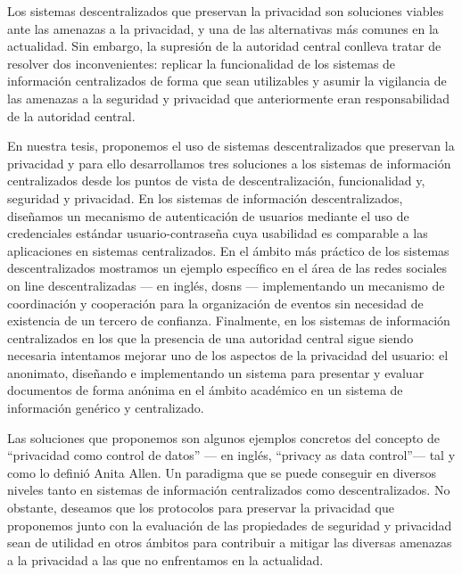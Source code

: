     Los sistemas descentralizados que preservan la privacidad son soluciones viables  
    ante las amenazas a la privacidad, y una de las alternativas más comunes en 
    la actualidad. Sin embargo, la supresión de la autoridad central conlleva tratar 
    de resolver dos inconvenientes: replicar la funcionalidad de los sistemas 
    de información centralizados de forma que sean utilizables y asumir la vigilancia  
    de las amenazas a la seguridad y privacidad que anteriormente eran responsabilidad 
    de la autoridad central.
    
    En nuestra tesis, proponemos el uso de sistemas descentralizados que preservan 
    la privacidad y para ello desarrollamos tres soluciones a los sistemas de información 
    centralizados desde los puntos de vista de descentralización, funcionalidad 
    y, seguridad y privacidad. En los sistemas de información descentralizados, 
    diseñamos un mecanismo de autenticación de usuarios mediante el uso de credenciales 
    estándar usuario-contraseña cuya usabilidad es comparable a las aplicaciones 
    en sistemas centralizados. En el ámbito más práctico de los sistemas descentralizados 
    mostramos un ejemplo específico en el área de las redes sociales on line descentralizadas 
    --- en inglés, \aclp*{dosn} --- implementando un mecanismo de coordinación y 
    cooperación para la organización de eventos sin necesidad de existencia de un 
    tercero de confianza. Finalmente, en los sistemas de información centralizados 
    en los que la presencia de una autoridad central sigue siendo necesaria intentamos 
    mejorar uno de los aspectos de la privacidad del usuario: el anonimato, diseñando 
    e implementando un sistema para presentar y evaluar documentos de forma anónima 
    en el ámbito académico en un sistema de información genérico y centralizado.
    
    Las soluciones que proponemos son algunos ejemplos concretos del concepto de 
    ``privacidad como control de datos'' --- en inglés, ``privacy as data control''--- 
    tal y como lo definió Anita Allen. Un paradigma que se puede conseguir en diversos 
    niveles tanto en sistemas de información centralizados como descentralizados. 
    No obstante, deseamos que los protocolos para preservar la privacidad que proponemos 
    junto con la evaluación de las propiedades de seguridad y privacidad sean de 
    utilidad en otros ámbitos para contribuir a mitigar las diversas amenazas a 
    la privacidad a las que no enfrentamos en la actualidad.
    